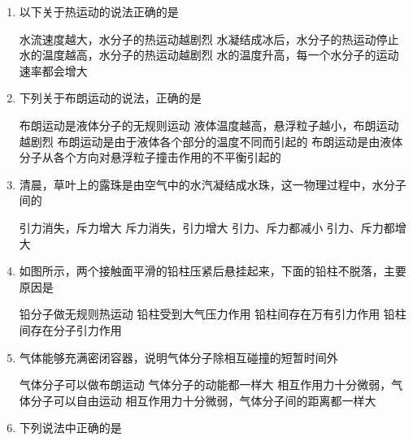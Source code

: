 

\begin{enumerate}[leftmargin=0em]
\renewcommand{\labelenumi}{\arabic{enumi}.}
\item
{}
以下关于热运动的说法正确的是  


\fourchoices
{水流速度越大，水分子的热运动越剧烈}
{水凝结成冰后，水分子的热运动停止}
{水的温度越高，水分子的热运动越剧烈}
{水的温度升高，每一个水分子的运动速率都会增大}



\item
{}
下列关于布朗运动的说法，正确的是  


\fourchoices
{布朗运动是液体分子的无规则运动}
{液体温度越高，悬浮粒子越小，布朗运动越剧烈}
{布朗运动是由于液体各个部分的温度不同而引起的}
{布朗运动是由液体分子从各个方向对悬浮粒子撞击作用的不平衡引起的}

\item 
{}
清晨，草叶上的露珠是由空气中的水汽凝结成水珠，这一物理过程中，水分子间的  


\fourchoices
{引力消失，斥力增大}
{斥力消失，引力增大}
{引力、斥力都减小}
{引力、斥力都增大}


\item
{}
如图所示，两个接触面平滑的铅柱压紧后悬挂起来，下面的铅柱不脱落，主要原因是  
\begin{figure}[h!]
\centering

\end{figure}

\fourchoices
{铅分子做无规则热运动}
{铅柱受到大气压力作用}
{铅柱间存在万有引力作用}
{铅柱间存在分子引力作用}


\item
{}
气体能够充满密闭容器，说明气体分子除相互碰撞的短暂时间外  


\fourchoices
{气体分子可以做布朗运动}
{气体分子的动能都一样大}
{相互作用力十分微弱，气体分子可以自由运动}
{相互作用力十分微弱，气体分子间的距离都一样大}


\item
{}
下列说法中正确的是  



\end{enumerate}
